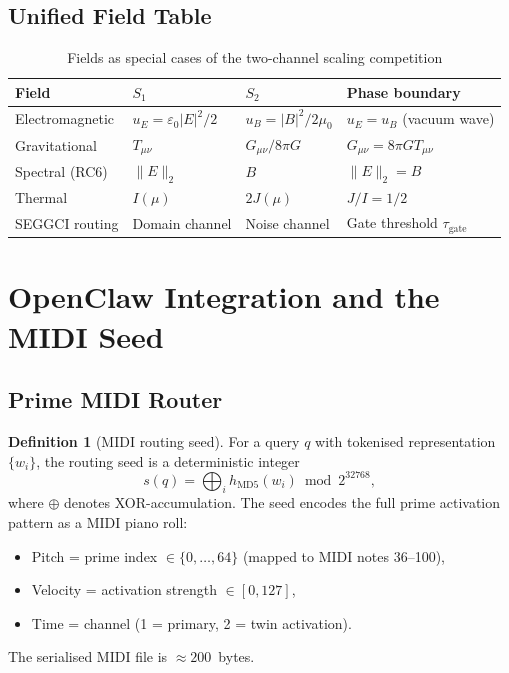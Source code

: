 \documentclass[12pt,a4paper]{article}
\theoremstyle{plain}
\theoremstyle{definition}
\newtheorem{definition}[theorem]{Definition}
\theoremstyle{remark}
\begin{document}
\subsection{Unified Field Table}

\begin{table}[H]
\centering
\caption{Fields as special cases of the two-channel scaling competition}
\label{tab:fields}
\renewcommand{\arraystretch}{1.3}
\begin{tabular}{llll}
\toprule
\textbf{Field} & $S_1$ & $S_2$ & \textbf{Phase boundary} \\
\midrule
Electromagnetic & $u_E = \varepsilon_0|E|^2/2$ & $u_B = |B|^2/2\mu_0$
  & $u_E = u_B$ (vacuum wave) \\
Gravitational   & $T_{\mu\nu}$                  & $G_{\mu\nu}/8\pi G$
  & $G_{\mu\nu} = 8\pi G T_{\mu\nu}$ \\
Spectral (RC6)  & $\|E\|_2$                    & $B$
  & $\|E\|_2 = B$ \\
Thermal         & $I(\mu)$                      & $2J(\mu)$
  & $J/I = 1/2$ \\
SEGGCI routing  & Domain channel                & Noise channel
  & Gate threshold $\tau_{\text{gate}}$ \\
\bottomrule
\end{tabular}
\end{table}

\section{OpenClaw Integration and the MIDI Seed}
\label{sec:openclaw}

\subsection{Prime MIDI Router}

\begin{definition}[MIDI routing seed]
For a query $q$ with tokenised representation $\{w_i\}$, the routing
seed is a deterministic integer
\begin{equation}
s(q) = \bigoplus_{i} h_{\text{MD5}}(w_i) \bmod 2^{32768},
\end{equation}
where $\oplus$ denotes XOR-accumulation.  The seed encodes the full
prime activation pattern as a MIDI piano roll:
\begin{itemize}[noitemsep]
  \item Pitch = prime index $\in \{0,\ldots,64\}$ (mapped to MIDI notes 36--100),
  \item Velocity = activation strength $\in [0,127]$,
  \item Time = channel (1 = primary, 2 = twin activation).
\end{itemize}
The serialised MIDI file is $\approx 200$~bytes.
\end{definition}
\end{document}
